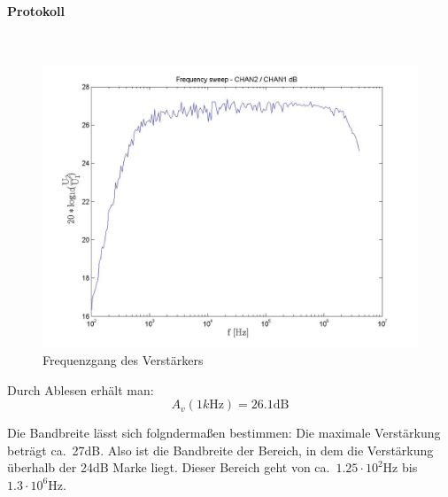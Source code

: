 \documentclass[10pt]{scrreprt}
\begin{document}
    \paragraph{Protokoll}
    $ $
    \begin{figure}[H]
        \includegraphics[width=\textwidth]{BS43_frequencysweep_ylogxlog.jpg}
        \caption{Frequenzgang des Verstärkers}
        \label{}
    \end{figure}

    Durch Ablesen erhält man:
    \begin{equation*}
        A_v(1\si{k\hertz}) = 26.1 \text{dB}
    \end{equation*}

    Die Bandbreite lässt sich folgndermaßen bestimmen: Die maximale Verstärkung
    beträgt ca.~27dB. Also ist die Bandbreite der Bereich, in dem die Verstärkung
    überhalb der 24dB Marke liegt. Dieser Bereich geht von ca.~$1.25 \cdot 10^2 \si{\hertz}$
    bis $1.3 \cdot 10^6 \si{\hertz}$.
\end{document}
